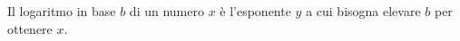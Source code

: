 \documentclass[preview]{standalone}
\begin{document}
\begin{center}
Il logaritmo in base $b$ di un numero $x$ è l'esponente $y$ a cui bisogna elevare $b$ per ottenere $x$.
\end{center}
\end{document}
